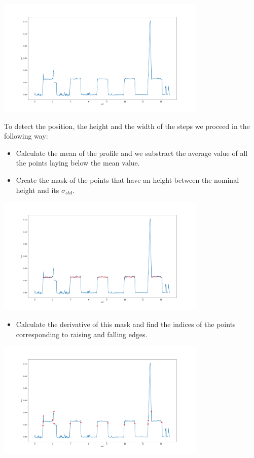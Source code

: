 \documentclass{article}
\begin{document}
\begin{center}
    \includegraphics[width=0.75\textwidth]{../images/steps_1.png}
\end{center}
To detect the position, the height and the width of the steps we proceed in the following way:
\begin{itemize}
    \item Calculate the mean of the profile and we substract the average value of all the points laying below the mean value.
    \item Create the mask of the points that have an height between the nominal height and its $\sigma_{std}$.
\end{itemize}
\begin{center}
    \includegraphics[width=0.75\textwidth]{../images/steps_2.png}
\end{center}
\begin{itemize}
    \item Calculate the derivative of this mask and find the indices of the points corresponding to raising and falling edges.
\end{itemize}    
\begin{center}
    \includegraphics[width=0.75\textwidth]{../images/steps_3.png}
\end{center}
\end{document}
